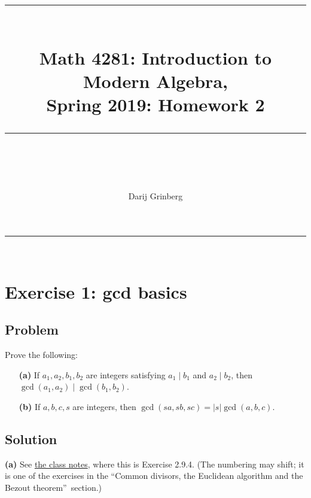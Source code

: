 \documentclass[paper=a4, fontsize=12pt]{scrartcl}%
\theoremstyle{plainsl}
\theoremstyle{definition}
\theoremstyle{remark}
\begin{document}
\title{ \\[25pt] \rule{\linewidth}{0.5pt} \\[0.4cm] {\huge Math 4281: Introduction to Modern Algebra, }\\Spring 2019: Homework 2\\\rule{\linewidth}{2pt} \\[0.5cm] }
\author{Darij Grinberg}
\maketitle

\rule{\linewidth}{0.3pt} \\[0.4cm]

\section{Exercise 1: gcd basics}

\subsection{Problem}

Prove the following:

\begin{enumerate}
\item[\textbf{(a)}] If $a_{1}, a_{2}, b_{1}, b_{2}$ are integers satisfying
$a_{1} \mid b_{1}$ and $a_{2} \mid b_{2}$, then $\gcd\left(  a_{1}, a_{2}
\right)  \mid\gcd\left(  b_{1}, b_{2} \right)  $.

\item[\textbf{(b)}] If $a, b, c, s$ are integers, then $\gcd\left(  sa, sb, sc
\right)  = \left|  s \right|  \gcd\left(  a, b, c \right)  $.
\end{enumerate}

\subsection{Solution}

\textbf{(a)} See
\href{http://www.cip.ifi.lmu.de/~grinberg/t/19s/notes.pdf}{the class notes},
where this is Exercise 2.9.4. (The numbering may shift; it is one of the
exercises in the \textquotedblleft Common divisors, the Euclidean algorithm
and the Bezout theorem\textquotedblright\ section.)
\end{document}
